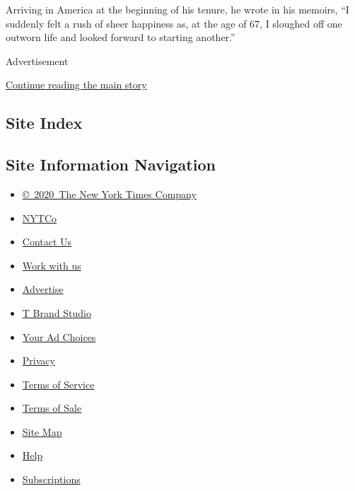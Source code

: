 Arriving in America at the beginning of his tenure, he wrote in his
memoirs, ``I suddenly felt a rush of sheer happiness as, at the age of
67, I sloughed off one outworn life and looked forward to starting
another.''

Advertisement

\protect\hyperlink{after-bottom}{Continue reading the main story}

\hypertarget{site-index}{%
\subsection{Site Index}\label{site-index}}

\hypertarget{site-information-navigation}{%
\subsection{Site Information
Navigation}\label{site-information-navigation}}

\begin{itemize}
\tightlist
\item
  \href{https://help.nytimes.com/hc/en-us/articles/115014792127-Copyright-notice}{©~2020~The
  New York Times Company}
\end{itemize}

\begin{itemize}
\tightlist
\item
  \href{https://www.nytco.com/}{NYTCo}
\item
  \href{https://help.nytimes.com/hc/en-us/articles/115015385887-Contact-Us}{Contact
  Us}
\item
  \href{https://www.nytco.com/careers/}{Work with us}
\item
  \href{https://nytmediakit.com/}{Advertise}
\item
  \href{http://www.tbrandstudio.com/}{T Brand Studio}
\item
  \href{https://www.nytimes.com/privacy/cookie-policy\#how-do-i-manage-trackers}{Your
  Ad Choices}
\item
  \href{https://www.nytimes.com/privacy}{Privacy}
\item
  \href{https://help.nytimes.com/hc/en-us/articles/115014893428-Terms-of-service}{Terms
  of Service}
\item
  \href{https://help.nytimes.com/hc/en-us/articles/115014893968-Terms-of-sale}{Terms
  of Sale}
\item
  \href{https://spiderbites.nytimes.com}{Site Map}
\item
  \href{https://help.nytimes.com/hc/en-us}{Help}
\item
  \href{https://www.nytimes.com/subscription?campaignId=37WXW}{Subscriptions}
\end{itemize}

